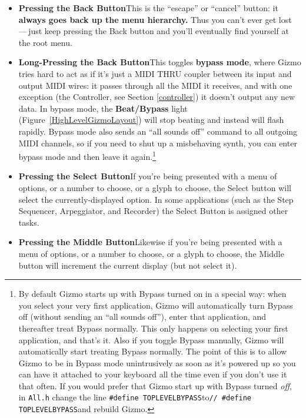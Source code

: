 \documentclass{article}
\begin{document}
\begin{itemize}
\item {\bf Pressing the Back Button}\quad This is the ``escape'' or ``cancel'' button: it {\bf always goes back up the menu hierarchy.}  Thus you can't ever get lost\,---\,just keep pressing the Back button and you'll eventually find yourself at the root menu.

\item {\bf Long-Pressing the Back Button}\quad This toggles {\bf bypass mode}, where Gizmo tries hard to act as if it's just a MIDI THRU coupler between its input and output MIDI wires: it passes through all the MIDI it receives, and with one exception (the Controller, see Section \ref{controller}) it doesn't output any new data.  In bypass mode, the {\bf Beat/Bypass} light (Figure~\ref{HighLevelGizmoLayout}) will stop beating and instead will flash rapidly.  Bypass mode also sends an ``all sounds off'' command to all outgoing MIDI channels, so if you need to shut up a misbehaving synth, you can enter bypass mode and then leave it again.\footnote{By default Gizmo starts up with Bypass turned on in a special way: when you select your very first application, Gizmo will automatically turn Bypass off (without sending an ``all sounds off''), enter that application, and thereafter treat Bypass normally.  This only happens on selecting your first application, and that's it.  Also if you toggle Bypass manually, Gizmo will automatically start treating Bypass normally.  The point of this is to allow Gizmo to be in Bypass mode unintrusively as soon as it's powered up so you can have it attached to your keyboard all the time even if you don't use it that often.  If you would prefer that Gizmo start up with Bypass turned {\it off}, in \texttt{All.h} change the line \texttt{\#define TOPLEVEL{\textunderscore}BYPASS}\quad to\quad\texttt{// \#define TOPLEVEL{\textunderscore}BYPASS}\quad and rebuild Gizmo.}

\item {\bf Pressing the Select Button}\quad If you're being presented with a menu of options, or a number to choose, or a glyph to choose, the Select button will select the currently-displayed option.  In some applications (such as the Step Sequencer, Arpeggiator, and Recorder) the Select Button is assigned other tasks.

\item {\bf Pressing the Middle Button}\quad Likewise if you're being presented with a menu of options, or a number to choose, or a glyph to choose, the Middle button will increment the current display (but not select it). 
\end{itemize}
\end{document}
